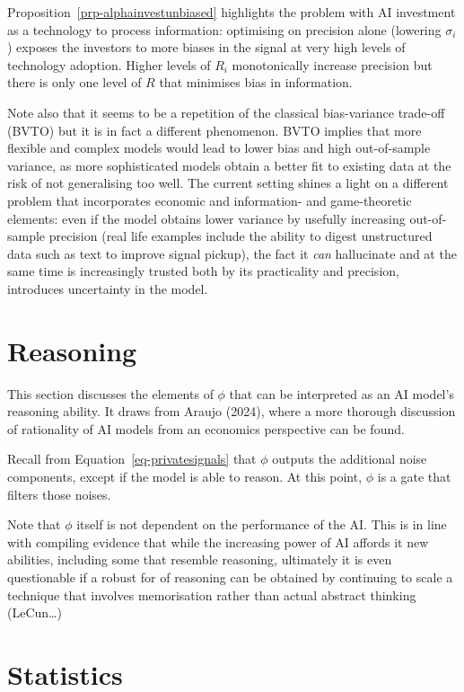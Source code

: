 \documentclass[
]{article}
\theoremstyle{plain}
\theoremstyle{remark}
\begin{document}
Proposition~\ref{prp-alphainvestunbiased} highlights the problem with AI
investment as a technology to process information: optimising on
precision alone (lowering \(\sigma_i\)) exposes the investors to more
biases in the signal at very high levels of technology adoption. Higher
levels of \(R_i\) monotonically increase precision but there is only one
level of \(R\) that minimises bias in information.

Note also that it seems to be a repetition of the classical
bias-variance trade-off (BVTO) but it is in fact a different phenomenon.
BVTO implies that more flexible and complex models would lead to lower
bias and high out-of-sample variance, as more sophisticated models
obtain a better fit to existing data at the risk of not generalising too
well. The current setting shines a light on a different problem that
incorporates economic and information- and game-theoretic elements: even
if the model obtains lower variance by usefully increasing out-of-sample
precision (real life examples include the ability to digest unstructured
data such as text to improve signal pickup), the fact it \emph{can}
hallucinate and at the same time is increasingly trusted both by its
practicality and precision, introduces uncertainty in the model.

\hypertarget{sec-reasoning}{%
\section{Reasoning}\label{sec-reasoning}}

This section discusses the elements of \(\phi\) that can be interpreted
as an AI model's reasoning ability. It draws from Araujo (2024), where a
more thorough discussion of rationality of AI models from an economics
perspective can be found.

Recall from Equation~\ref{eq-privatesignals} that \(\phi\) outputs the
additional noise components, except if the model is able to reason. At
this point, \(\phi\) is a gate that filters those noises.

Note that \(\phi\) itself is not dependent on the performance of the AI.
This is in line with compiling evidence that while the increasing power
of AI affords it new abilities, including some that resemble reasoning,
ultimately it is even questionable if a robust for of reasoning can be
obtained by continuing to scale a technique that involves memorisation
rather than actual abstract thinking (LeCun\ldots)

\hypertarget{statistics}{%
\section{Statistics}\label{statistics}}
\end{document}
